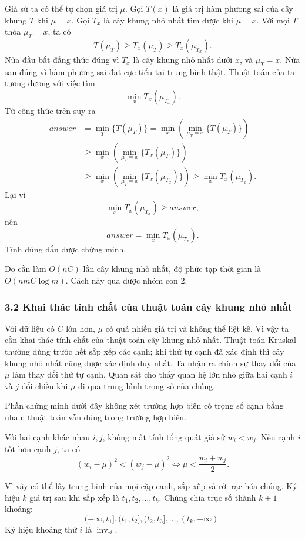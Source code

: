 \documentclass[11pt]{article}
\begin{document}
Giả sử ta có thể tự chọn giá trị \(\mu\). Gọi \(T(x)\) là giá trị hàm phương
sai của cây khung \(T\) khi \(\mu=x\). Gọi \(T_x\) là cây khung nhỏ nhất tìm
được khi \(\mu=x\). Với mọi \(T\) thỏa \(\mu_T=x\), ta có
\[
  T(\mu_T)\ge T_x(\mu_T)\ge T_x(\mu_{T_x}). \tag{3.2}
\]
Nửa đầu bất đẳng thức đúng vì \(T_x\) là cây khung nhỏ nhất dưới \(x\), và
\(\mu_T=x\). Nửa sau đúng vì hàm phương sai đạt cực tiểu tại trung bình thật.
Thuật toán của ta tương đương với việc tìm
\[
  \min_x T_x(\mu_{T_x}).
\]
Từ công thức trên suy ra
\[
\begin{aligned}
  \textit{answer}
  &=\min_T\{T(\mu_T)\}
    =\min_x\left(\min_{\mu_T=x}\{T(\mu_T)\}\right)\\
  &\ge \min_x\left(\min_{\mu_T=x}\{T_x(\mu_T)\}\right)\\
  &\ge \min_x\left(\min_{\mu_T=x}\{T_x(\mu_{T_x})\}\right)
    \ge \min_x T_x(\mu_{T_x}).
\end{aligned}
\]
Lại vì
\[
  \min_x T_x(\mu_{T_x})\ge \textit{answer},
\]
nên
\[
  \textit{answer}=\min_x T_x(\mu_{T_x}).
\]
Tính đúng đắn được chứng minh.

Do cần làm \(O(nC)\) lần cây khung nhỏ nhất, độ phức tạp thời gian là
\(O(nmC\log m)\). Cách này qua được nhóm con 2.

\subsubsection*{3.2 Khai thác tính chất của thuật toán cây khung nhỏ nhất}

Với dữ liệu có \(C\) lớn hơn, \(\mu\) có quá nhiều giá trị và không thể liệt
kê. Vì vậy ta cần khai thác tính chất của thuật toán cây khung nhỏ nhất. Thuật
toán Kruskal thường dùng trước hết sắp xếp các cạnh; khi thứ tự cạnh đã xác
định thì cây khung nhỏ nhất cũng được xác định duy nhất. Ta nhận ra chính sự
thay đổi của \(\mu\) làm thay đổi thứ tự cạnh. Quan sát cho thấy quan hệ lớn
nhỏ giữa hai cạnh \(i\) và \(j\) đổi chiều khi \(\mu\) đi qua trung bình trọng
số của chúng.

Phần chứng minh dưới đây không xét trường hợp biên có trọng số cạnh bằng nhau;
thuật toán vẫn đúng trong trường hợp biên.

Với hai cạnh khác nhau \(i,j\), không mất tính tổng quát giả sử \(w_i<w_j\).
Nếu cạnh \(i\) tốt hơn cạnh \(j\), ta có
\[
  (w_i-\mu)^2<(w_j-\mu)^2
  \Longleftrightarrow
  \mu<\frac{w_i+w_j}{2}. \tag{3.3}
\]

Vì vậy có thể lấy trung bình của mọi cặp cạnh, sắp xếp và rời rạc hóa chúng.
Ký hiệu \(k\) giá trị sau khi sắp xếp là \(t_1,t_2,\ldots,t_k\). Chúng chia trục
số thành \(k+1\) khoảng:
\[
  (-\infty,t_1],(t_1,t_2],(t_2,t_3],\ldots,(t_k,+\infty).
\]
Ký hiệu khoảng thứ \(i\) là \(\operatorname{invl}_i\).
\end{document}
